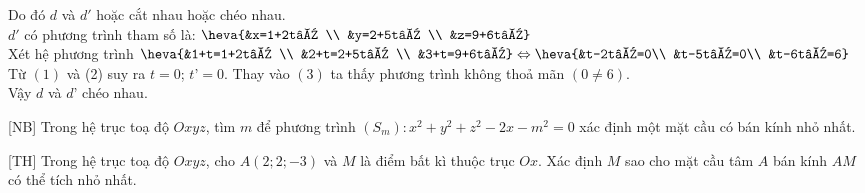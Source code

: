 \begin{bt}
{\begin{enumerate}
			Do đó $d$ và $d'$ hoặc cắt nhau hoặc chéo nhau.\\
			${d}'$ có phương trình tham số là:
			$\heva{&x=1+2t’ \\
				&y=2+5t’ \\
				&z=9+6t’}$\\
			Xét hệ phương trình $\heva{&1+t=1+2t’ \\
				&2+t=2+5t’ \\
				&3+t=9+6t’}
				\Leftrightarrow \heva{&t-2t’=0\\
					&t-5t’=0\\
					&t-6t’=6}$\\
			Từ $(1)$ và (2) suy ra $t=0$; $t’=0$. Thay vào $(3)$ ta thấy phương trình không thoả mãn $\left( 0\ne 6 \right)$.\\
			Vậy $d$ và $d’$ chéo nhau.
		\end{enumerate}
	}
\end{bt}

\begin{bt}%
[NB]%
	Trong hệ trục toạ độ $Oxyz$, tìm $m$ để phương trình $(S_m) \colon x^2+y^2+z^2-2x-m^2 = 0$ xác định một mặt cầu có bán kính nhỏ nhất.
\end{bt}

\begin{bt}%
[TH]%
	Trong hệ trục toạ độ $Oxyz$, cho $A(2;2;-3)$ và $M$ là điểm bất kì thuộc trục $Ox$. Xác định $M$ sao cho mặt cầu tâm $A$ bán kính $AM$ có thể tích nhỏ nhất.
\end{bt}

